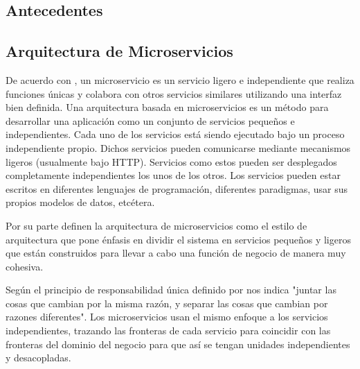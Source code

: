
\subsection{Antecedentes}

%
%
%


\subsection{Arquitectura de Microservicios}

De acuerdo con \cite{dmitry2014micro}, un microservicio es un servicio ligero e independiente que
realiza funciones únicas y colabora con otros servicios similares utilizando una interfaz bien definida.
Una arquitectura basada en microservicios es un método para desarrollar una aplicación como un conjunto
de servicios pequeños e independientes. Cada uno de los servicios está siendo ejecutado bajo un
proceso independiente propio. Dichos servicios pueden comunicarse mediante mecanismos ligeros (usualmente
bajo HTTP). Servicios como estos pueden ser desplegados completamente independientes los unos de los otros.
Los servicios pueden estar escritos en diferentes lenguajes de programación, diferentes paradigmas,
usar sus propios modelos de datos, etcétera.

Por su parte \cite{alshuqayran2016systematic} definen la arquitectura de microservicios como el estilo de arquitectura
que pone énfasis en dividir el sistema en servicios pequeños y ligeros que están construidos para
llevar a cabo una función de negocio de manera muy cohesiva.

Según el principio de responsabilidad única definido por \cite{martin2013clean} nos indica "juntar las
cosas que cambian por la misma razón, y separar las cosas que cambian por razones diferentes".
Los microservicios usan el mismo enfoque a los servicios independientes, trazando las fronteras
de cada servicio para coincidir con las fronteras del dominio del negocio para que así
se tengan unidades independientes y desacopladas.

